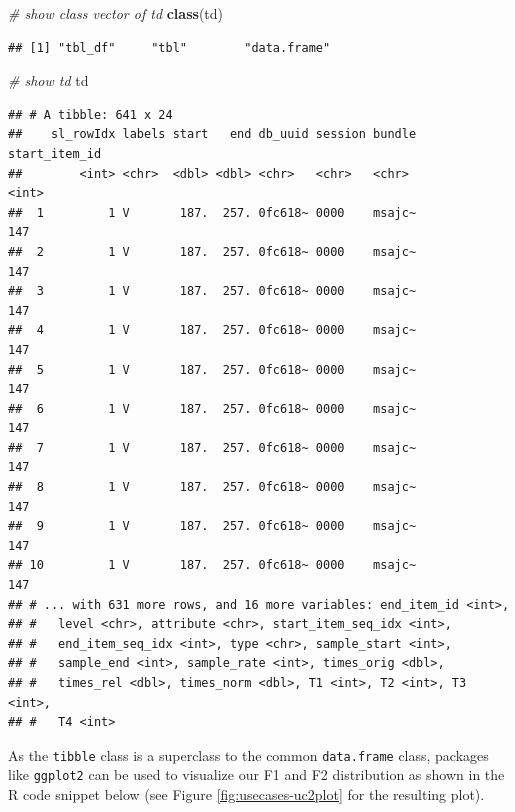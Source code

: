 \documentclass[]{book}
\newenvironment{Shaded}{\begin{snugshade}}{\end{snugshade}}
\newcommand{\CommentTok}[1]{\textcolor[rgb]{0.56,0.35,0.01}{\textit{#1}}}
\newcommand{\KeywordTok}[1]{\textcolor[rgb]{0.13,0.29,0.53}{\textbf{#1}}}
\newcommand{\NormalTok}[1]{#1}
\begin{document}
\begin{Shaded}
\begin{Highlighting}[]
\CommentTok{# show class vector of td}
\KeywordTok{class}\NormalTok{(td)}
\end{Highlighting}
\end{Shaded}

\begin{verbatim}
## [1] "tbl_df"     "tbl"        "data.frame"
\end{verbatim}

\begin{Shaded}
\begin{Highlighting}[]
\CommentTok{# show td}
\NormalTok{td}
\end{Highlighting}
\end{Shaded}

\begin{verbatim}
## # A tibble: 641 x 24
##    sl_rowIdx labels start   end db_uuid session bundle start_item_id
##        <int> <chr>  <dbl> <dbl> <chr>   <chr>   <chr>          <int>
##  1         1 V       187.  257. 0fc618~ 0000    msajc~           147
##  2         1 V       187.  257. 0fc618~ 0000    msajc~           147
##  3         1 V       187.  257. 0fc618~ 0000    msajc~           147
##  4         1 V       187.  257. 0fc618~ 0000    msajc~           147
##  5         1 V       187.  257. 0fc618~ 0000    msajc~           147
##  6         1 V       187.  257. 0fc618~ 0000    msajc~           147
##  7         1 V       187.  257. 0fc618~ 0000    msajc~           147
##  8         1 V       187.  257. 0fc618~ 0000    msajc~           147
##  9         1 V       187.  257. 0fc618~ 0000    msajc~           147
## 10         1 V       187.  257. 0fc618~ 0000    msajc~           147
## # ... with 631 more rows, and 16 more variables: end_item_id <int>,
## #   level <chr>, attribute <chr>, start_item_seq_idx <int>,
## #   end_item_seq_idx <int>, type <chr>, sample_start <int>,
## #   sample_end <int>, sample_rate <int>, times_orig <dbl>,
## #   times_rel <dbl>, times_norm <dbl>, T1 <int>, T2 <int>, T3 <int>,
## #   T4 <int>
\end{verbatim}

As the \texttt{tibble} class is a superclass to the common \texttt{data.frame} class, packages like \texttt{ggplot2} can be used to visualize our F1 and F2 distribution as shown in the R code snippet below (see Figure \ref{fig:usecases-uc2plot} for the resulting plot).
\end{document}
